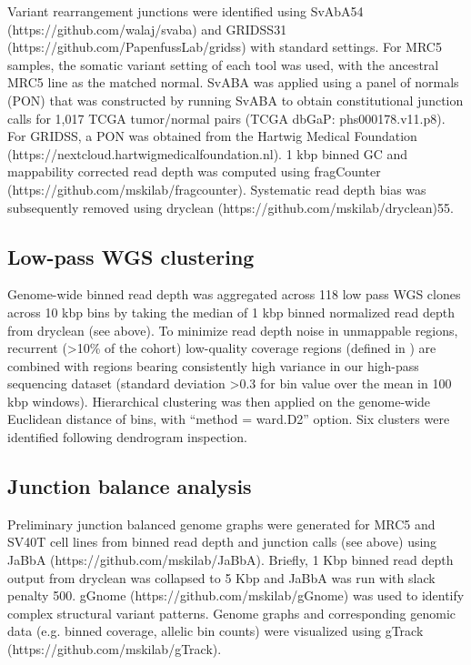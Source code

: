 \documentclass[phd,tocprelim]{cornell}
\begin{document}
Variant rearrangement junctions were identified using SvAbA54 (https://github.com/walaj/svaba) and GRIDSS31 (https://github.com/PapenfussLab/gridss) with standard settings. For MRC5 samples, the somatic variant setting of each tool was used, with the ancestral MRC5 line as the matched normal.  SvABA was applied using a panel of normals (PON) that was constructed by running SvABA to obtain constitutional junction calls for 1,017 TCGA tumor/normal pairs (TCGA dbGaP: phs000178.v11.p8).  For GRIDSS, a PON was obtained from the Hartwig Medical Foundation (https://nextcloud.hartwigmedicalfoundation.nl). 1 kbp binned GC and mappability corrected read depth was computed using fragCounter (https://github.com/mskilab/fragcounter). Systematic read depth bias was subsequently removed using dryclean (https://github.com/mskilab/dryclean)55.

\subsection*{Low-pass WGS clustering}
Genome-wide binned read depth was aggregated across 118 low pass WGS clones across 10 kbp bins by taking the median of 1 kbp binned normalized read depth from dryclean (see above). To minimize read depth noise in unmappable regions, recurrent (>10\% of the cohort) low-quality coverage regions (defined in \cite{Hadi2020-um}) are combined with regions bearing consistently high variance in our high-pass sequencing dataset (standard deviation >0.3 for bin value over the mean in 100 kbp windows). Hierarchical clustering was then applied on the genome-wide Euclidean distance of bins, with “method = ward.D2” option. Six clusters were identified following dendrogram inspection.  

\subsection*{Junction balance analysis}
Preliminary junction balanced genome graphs were generated for MRC5 and SV40T cell lines from binned read depth and junction calls (see above) using JaBbA (https://github.com/mskilab/JaBbA)\cite{Hadi2020-um}. Briefly, 1 Kbp binned read depth output from dryclean was collapsed to 5 Kbp and JaBbA was run with slack penalty 500. gGnome (https://github.com/mskilab/gGnome) was used to identify complex structural variant patterns. Genome graphs and corresponding genomic data (e.g. binned coverage, allelic bin counts) were visualized using gTrack (https://github.com/mskilab/gTrack). 
\end{document}
